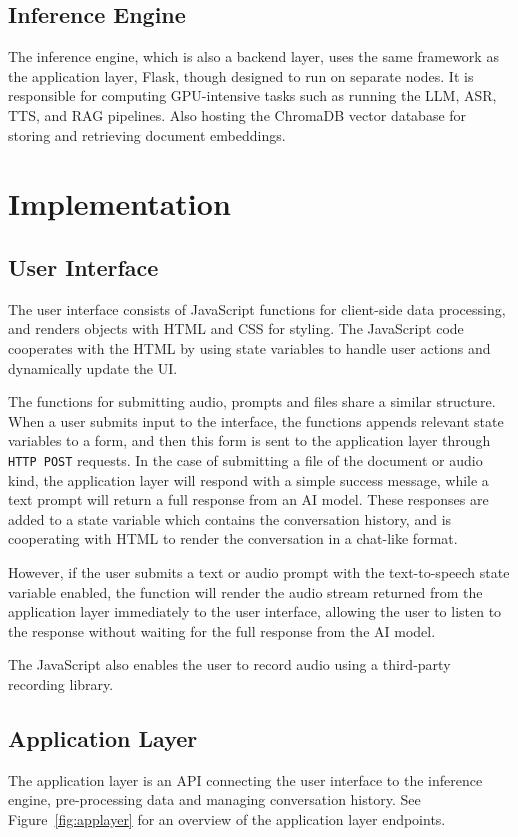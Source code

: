 \documentclass[twocolumn]{article}
\begin{document}
\subsection{Inference Engine}
The inference engine, which is also a backend layer, uses the same framework as the application layer, Flask, though designed to run on separate nodes.
It is responsible for computing GPU-intensive tasks such as running the LLM, ASR, TTS, and RAG pipelines. Also hosting the ChromaDB\cite{chromadb2023} vector
database for storing and retrieving document embeddings.

\section{Implementation}
\subsection{User Interface}
The user interface consists of JavaScript functions for client-side data processing, and renders objects with HTML and CSS for styling. The JavaScript code cooperates with the HTML by using state variables to handle user actions and dynamically update the UI.

The functions for submitting audio, prompts and files share a similar structure. \\
When a user submits input to the interface, the functions appends relevant state variables to a form, and then this form is sent to the application layer through \verb|HTTP POST| requests. In the case of submitting a file of the document or audio kind, the application layer will respond with a simple success message, while a text prompt will return a full response from an AI model. These responses are added to a state variable which contains the conversation history, and is cooperating with HTML to render the conversation in a chat-like format.

However, if the user submits a text or audio prompt with the text-to-speech state variable enabled, the function will render the audio stream returned from the application layer immediately to the user interface, allowing the user to listen to the response without waiting for the full response from the AI model.

The JavaScript also enables the user to record audio using a third-party recording library.

\subsection{Application Layer}
The application layer is an API connecting the user interface to the inference engine, pre-processing data and managing conversation history. See Figure~\ref{fig:applayer} for an overview of the application layer endpoints.
\end{document}
